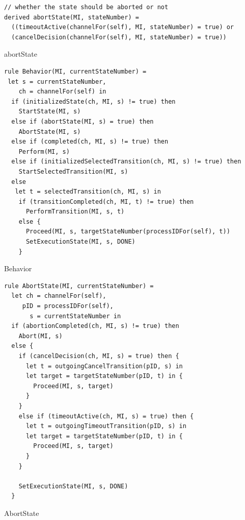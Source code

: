 \begin{listing}[H]
\begin{verbatim}
// whether the state should be aborted or not
derived abortState(MI, stateNumber) =
  ((timeoutActive(channelFor(self), MI, stateNumber) = true) or
  (cancelDecision(channelFor(self), MI, stateNumber) = true))
\end{verbatim}
\caption{abortState}
\label{lst:asm:abortState}
\end{listing}




\begin{listing}[H]
\begin{verbatim}
rule Behavior(MI, currentStateNumber) =
 let s = currentStateNumber,
    ch = channelFor(self) in
  if (initializedState(ch, MI, s) != true) then
    StartState(MI, s)
  else if (abortState(MI, s) = true) then
    AbortState(MI, s)
  else if (completed(ch, MI, s) != true) then
    Perform(MI, s)
  else if (initializedSelectedTransition(ch, MI, s) != true) then
    StartSelectedTransition(MI, s)
  else
   let t = selectedTransition(ch, MI, s) in
    if (transitionCompleted(ch, MI, t) != true) then
      PerformTransition(MI, s, t)
    else {
      Proceed(MI, s, targetStateNumber(processIDFor(self), t))
      SetExecutionState(MI, s, DONE)
    }
\end{verbatim}
\caption{Behavior}
\label{lst:asm:Behavior}
\end{listing}




\begin{listing}[H]
\begin{verbatim}
rule AbortState(MI, currentStateNumber) =
  let ch = channelFor(self),
     pID = processIDFor(self),
       s = currentStateNumber in
  if (abortionCompleted(ch, MI, s) != true) then
    Abort(MI, s)
  else {
    if (cancelDecision(ch, MI, s) = true) then {
      let t = outgoingCancelTransition(pID, s) in
      let target = targetStateNumber(pID, t) in {
        Proceed(MI, s, target)
      }
    }
    else if (timeoutActive(ch, MI, s) = true) then {
      let t = outgoingTimeoutTransition(pID, s) in
      let target = targetStateNumber(pID, t) in {
        Proceed(MI, s, target)
      }
    }

    SetExecutionState(MI, s, DONE)
  }
\end{verbatim}
\caption{AbortState}
\label{lst:asm:AbortState}
\end{listing}



